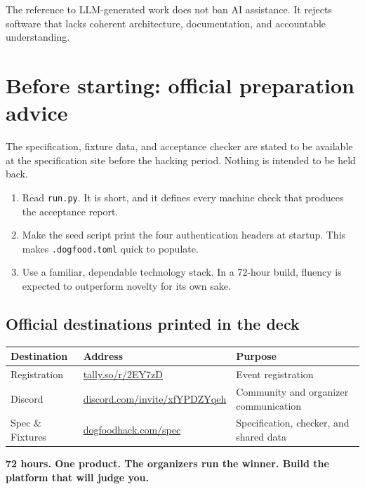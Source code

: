 \documentclass[11pt]{article}
\begin{document}
The reference to LLM-generated work does not ban AI assistance. It rejects software that lacks coherent architecture, documentation, and accountable understanding.

\section{Before starting: official preparation advice}

The specification, fixture data, and acceptance checker are stated to be available at the specification site before the hacking period. Nothing is intended to be held back.

\begin{enumerate}
  \item Read \texttt{run.py}. It is short, and it defines every machine check that produces the acceptance report.
  \item Make the seed script print the four authentication headers at startup. This makes \texttt{.dogfood.toml} quick to populate.
  \item Use a familiar, dependable technology stack. In a 72-hour build, fluency is expected to outperform novelty for its own sake.
\end{enumerate}

\subsection{Official destinations printed in the deck}

\begin{tabularx}{\linewidth}{@{}L{30mm}L{70mm}Y@{}}
\toprule
\textbf{Destination} & \textbf{Address} & \textbf{Purpose}\\
\midrule
Registration & \href{https://tally.so/r/2EY7zD}{tally.so/r/2EY7zD} & Event registration\\
Discord & \href{https://discord.com/invite/xfYPDZYqeh}{discord.com/invite/xfYPDZYqeh} & Community and organizer communication\\
Spec \& Fixtures & \href{https://dogfoodhack.com/spec}{dogfoodhack.com/spec} & Specification, checker, and shared data\\
\bottomrule
\end{tabularx}

\begin{keybox}
\textbf{72 hours. One product. The organizers run the winner. Build the platform that will judge you.}
\end{keybox}
\end{document}
